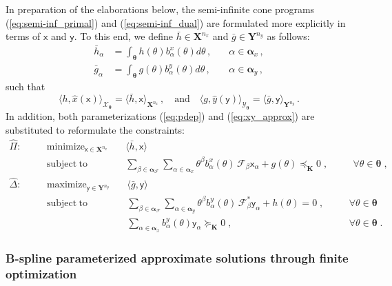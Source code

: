 \documentclass{article}
\DeclareMathOperator*{\minimize}{minimize}
\DeclareMathOperator*{\maximize}{maximize}
\DeclareMathOperator*{\subj}{subject\;to}
\newcommand{\ppar}{\theta}                          %
\newcommand{\Ppar}{{\bm{\theta}}}                   %
\newcommand{\X}{\mathbf{X}}                         %
\newcommand{\Y}{\mathbf{Y}}                         %
\newcommand{\K}{\mathbf{K}}                         %
\newcommand{\calF}{\mathcal{F}}                     %
\newcommand{\Xm}{{\bm{\mathcal{X}}_{\Ppar}}}        %
\newcommand{\Ym}{{\bm{\mathcal{Y}}_{\Ppar}}}        %
\newcommand{\bx}{b^x}               %
\newcommand{\bxa}{\bx_\alpha}       %
\newcommand{\cx}{\textsf{x}}        %
\newcommand{\cxa}{\cx_\alpha}       %
\newcommand{\nx}{{n_x}}             %
\newcommand{\by}{b^y}               %
\newcommand{\bya}{\by_\alpha}       %
\newcommand{\cy}{\textsf{y}}        %
\newcommand{\cya}{\cy_\alpha}       %
\newcommand{\ny}{{n_y}}             %
\newcommand{\Alpha}{\bm{\alpha}}    %
\newcommand{\meanh}{\bar{h}}        %
\newcommand{\meanha}{\meanh_\alpha} %
\newcommand{\meang}{\bar{g}}        %
\newcommand{\meanga}{\meang_\alpha} %
\begin{document}
In preparation of the elaborations below, the semi-infinite cone programs (\ref{eq:semi-inf_primal}) and (\ref{eq:semi-inf_dual}) are formulated more explicitly in terms of $\cx$ and $\cy$. To this end, we define $\meanh\in\X^\nx$ and $\meang\in\Y^\ny$ as follows:
\[\begin{aligned}
   \meanha &= \int_\Ppar h(\ppar)\bxa(\ppar) d\ppar \,, & \quad\alpha\in\Alpha_x \,,\\%
   \meanga &= \int_\Ppar g(\ppar)\bya(\ppar) d\ppar \,, & \quad\alpha\in\Alpha_y \,,   %
\end{aligned}\]
such that
\[ \langle h, \hat{x}(\cx) \rangle_\Xm = \langle \meanh, \cx \rangle_{\X^\nx} \,,\quad\text{and}\quad%
   \langle g, \hat{y}(\cy) \rangle_\Ym = \langle \meang, \cy \rangle_{\Y^\ny} \,. %
\]
In addition, both parameterizations (\ref{eq:pdep}) and (\ref{eq:xy_approx}) are substituted to reformulate the constraints:
\begin{subequations}\label{eq:semi-inf_primal_bis}
\begin{alignat}{4}
\hat{\Pi}: &\quad& \minimize_{\cx\in\X^\nx} &\quad \langle \meanh, \cx \rangle  \label{eq:semi-inf_primal_bis_a}\\%
           &\quad& \subj                    &\quad \sum_{\beta\in\Alpha_\calF}\sum_{\alpha\in\Alpha_x} \ppar^\beta\bxa(\ppar)\,\calF_\beta \cxa + g(\ppar)\preceq_\K 0 \;, &\quad& \forall \ppar\in\Ppar\;, \label{eq:semi-inf_primal_bis_b}%
\end{alignat}
\end{subequations}
\begin{subequations}\label{eq:semi-inf_dual_bis}
\begin{alignat}{4}
\hat{\Delta}: &\quad& \maximize_{\cy\in\Y^\ny} &\quad \langle \meang, \cy \rangle \label{eq:semi-inf_dual_bis_a}\\%
              &\quad& \subj                    &\quad \sum_{\beta\in\Alpha_\calF}\sum_{\alpha\in\Alpha_y} \ppar^\beta\bya(\ppar)\,\calF_\beta^* \cya + h(\ppar)= 0 \;, &\quad& \forall \ppar \in\Ppar \label{eq:semi-inf_dual_bis_b}\\%
              &\quad&                          &\quad \sum_{\alpha\in\Alpha_x} \bya(\ppar)\cya \succeq_\K 0                  \;, &\quad& \forall \ppar \in\Ppar\;. \label{eq:semi-inf_dual_bis_c}%
\end{alignat}
\end{subequations}


\subsubsection{B-spline parameterized approximate solutions through finite optimization}%
\end{document}
